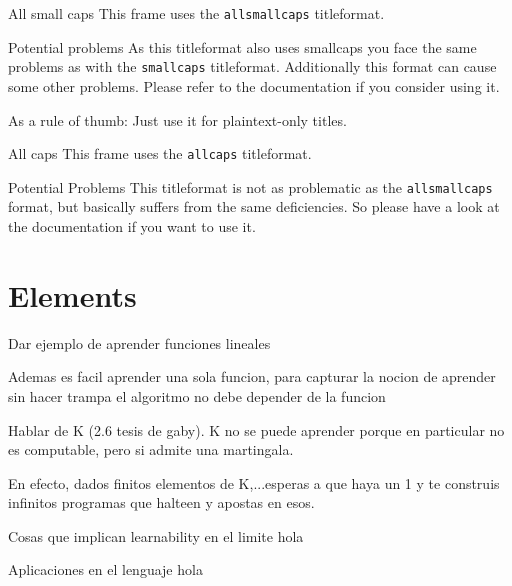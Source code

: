 \documentclass[10pt]{beamer}
\begin{document}
{
\begin{frame}{All small caps}
	This frame uses the \texttt{allsmallcaps} titleformat.

	\begin{alertblock}{Potential problems}
		As this titleformat also uses smallcaps you face the same problems as with the \texttt{smallcaps} titleformat. Additionally this format can cause some other problems. Please refer to the documentation if you consider using it.

		As a rule of thumb: Just use it for plaintext-only titles.
	\end{alertblock}
\end{frame}
}

{
\begin{frame}{All caps}
	This frame uses the \texttt{allcaps} titleformat.

	\begin{alertblock}{Potential Problems}
		This titleformat is not as problematic as the \texttt{allsmallcaps} format, but basically suffers from the same deficiencies. So please have a look at the documentation if you want to use it.
	\end{alertblock}
\end{frame}
}

\section{Elements}


\begin{frame}[fragile]{Dar ejemplo de aprender funciones lineales}

Ademas es facil aprender una sola funcion, para capturar la nocion de aprender sin hacer trampa el algoritmo no debe depender de la funcion


Hablar de K (2.6 tesis de gaby). K no se puede aprender porque en particular no es computable, pero si admite una martingala.

En efecto, dados finitos elementos de K,...esperas a que haya un 1 y te construis infinitos programas que halteen y apostas en esos.
\end{frame}



\begin{frame}[fragile]{Cosas que implican learnability en el limite}
hola
\end{frame}

\begin{frame}[fragile]{Aplicaciones en el lenguaje}
hola
\end{frame}
\end{document}
